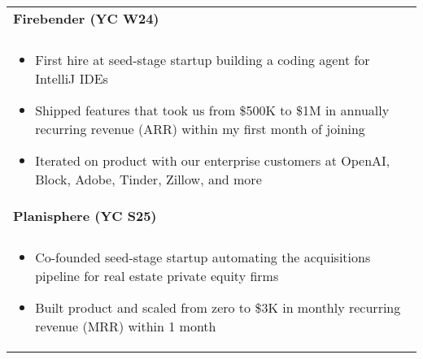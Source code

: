 \documentclass[letterpaper,10pt]{article} %
\begin{document}
\begin{tabular*}{\linewidth}{@{\extracolsep{\fill}} lr }

\textbf{Firebender (YC W24)} & \scriptsize\bfseries\color{sectioncolour}{San Francisco, CA}\\
\footnotesize\bfseries\color{sectioncolour}{Founding Engineer} & \scriptsize\bfseries\color{sectioncolour}{August 2025 - Present}\\
\multicolumn{2}{p{\linewidth}}{
    \scriptsize{\vspace{-0.1in}\begin{itemize}[nosep]
        \item First hire at seed-stage startup building a coding agent for IntelliJ IDEs
        \item Shipped features that took us from \$500K to \$1M in annually recurring revenue (ARR) within my first month of joining
        \item Iterated on product with our enterprise customers at OpenAI, Block, Adobe, Tinder, Zillow, and more
    \end{itemize}\vspace{-0.00in}}
}\\

\textbf{Planisphere (YC S25)} & \scriptsize\bfseries\color{sectioncolour}{San Francisco, CA}\\
\footnotesize\bfseries\color{sectioncolour}{Co-Founder \& CTO} & \scriptsize\bfseries\color{sectioncolour}{July 2025 - August 2025}\\
\multicolumn{2}{p{\linewidth}}{
    \scriptsize{\vspace{-0.1in}\begin{itemize}[nosep]
        \item Co-founded seed-stage startup automating the acquisitions pipeline for real estate private equity firms
        \item Built product and scaled from zero to \$3K in monthly recurring revenue (MRR) within 1 month
    \end{itemize}\vspace{-0.00in}}
}\\


\end{tabular*}
\end{document}
